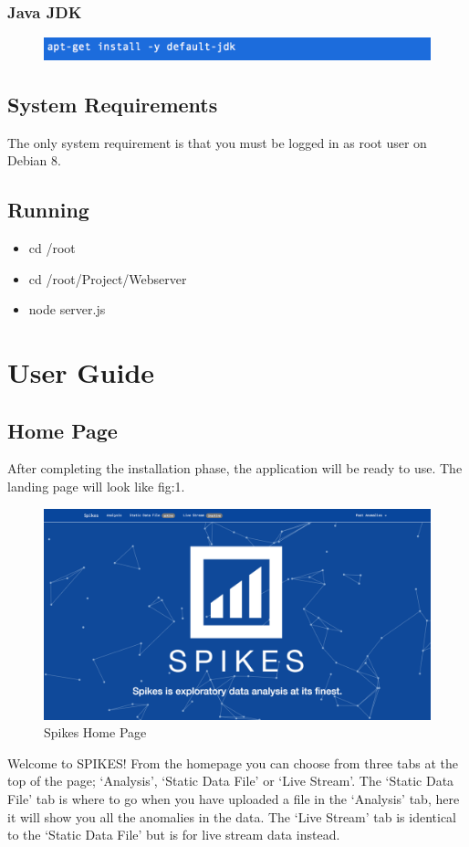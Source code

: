 \documentclass[12pt]{article}
\begin{document}
    \subsubsection{Java JDK}
    \begin{figure}[H]
    \centering
    \includegraphics[width=120mm]{java.png}
    \end{figure}
  \subsection{System Requirements}
  The only system requirement is that you must be logged in as root user on Debian 8.
  \subsection{Running }
  \begin{itemize}
    \item cd /root
    \item cd /root/Project/Webserver
    \item node server.js
  \end{itemize}
\section{User Guide}
  \subsection{Home Page}
  After completing the installation phase, the application will be ready to use. The landing page will look like
  fig:1.
  \begin{figure}[H]
  \centering
  \includegraphics[width=120mm]{home.png}
  \caption{Spikes Home Page}
  \end{figure}
  Welcome to SPIKES! From the homepage you can choose from three tabs at the top of the page; ‘Analysis’, ‘Static Data File’ or ‘Live Stream’.
  The ‘Static Data File’ tab is where to go when you have uploaded a file in the ‘Analysis’ tab, here it will show you all the anomalies in the data.
  The ‘Live Stream’ tab is identical to the ‘Static Data File’ but is for live stream data instead.
\end{document}

